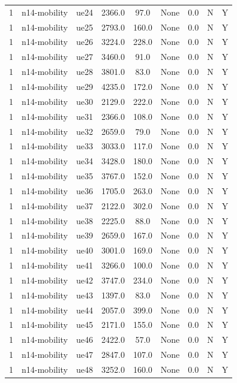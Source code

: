 \begin{table}[ht]
\begin{tabular}{|c|c|c|c|c|c|c|c|c|}
1 & n14-mobility & ue24 & 2366.0 & 97.0 & None & 0.0 & N & Y \\
1 & n14-mobility & ue25 & 2793.0 & 160.0 & None & 0.0 & N & Y \\
1 & n14-mobility & ue26 & 3224.0 & 228.0 & None & 0.0 & N & Y \\
1 & n14-mobility & ue27 & 3460.0 & 91.0 & None & 0.0 & N & Y \\
1 & n14-mobility & ue28 & 3801.0 & 83.0 & None & 0.0 & N & Y \\
1 & n14-mobility & ue29 & 4235.0 & 172.0 & None & 0.0 & N & Y \\
1 & n14-mobility & ue30 & 2129.0 & 222.0 & None & 0.0 & N & Y \\
1 & n14-mobility & ue31 & 2366.0 & 108.0 & None & 0.0 & N & Y \\
1 & n14-mobility & ue32 & 2659.0 & 79.0 & None & 0.0 & N & Y \\
1 & n14-mobility & ue33 & 3033.0 & 117.0 & None & 0.0 & N & Y \\
1 & n14-mobility & ue34 & 3428.0 & 180.0 & None & 0.0 & N & Y \\
1 & n14-mobility & ue35 & 3767.0 & 152.0 & None & 0.0 & N & Y \\
1 & n14-mobility & ue36 & 1705.0 & 263.0 & None & 0.0 & N & Y \\
1 & n14-mobility & ue37 & 2122.0 & 302.0 & None & 0.0 & N & Y \\
1 & n14-mobility & ue38 & 2225.0 & 88.0 & None & 0.0 & N & Y \\
1 & n14-mobility & ue39 & 2659.0 & 167.0 & None & 0.0 & N & Y \\
1 & n14-mobility & ue40 & 3001.0 & 169.0 & None & 0.0 & N & Y \\
1 & n14-mobility & ue41 & 3266.0 & 100.0 & None & 0.0 & N & Y \\
1 & n14-mobility & ue42 & 3747.0 & 234.0 & None & 0.0 & N & Y \\
1 & n14-mobility & ue43 & 1397.0 & 83.0 & None & 0.0 & N & Y \\
1 & n14-mobility & ue44 & 2057.0 & 399.0 & None & 0.0 & N & Y \\
1 & n14-mobility & ue45 & 2171.0 & 155.0 & None & 0.0 & N & Y \\
1 & n14-mobility & ue46 & 2422.0 & 57.0 & None & 0.0 & N & Y \\
1 & n14-mobility & ue47 & 2847.0 & 107.0 & None & 0.0 & N & Y \\
1 & n14-mobility & ue48 & 3252.0 & 160.0 & None & 0.0 & N & Y \\

\end{tabular}
\end{table}
